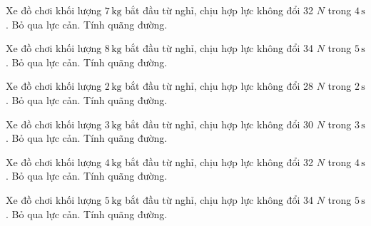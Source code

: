 \begin{ex}
Xe đồ chơi khối lượng $7\,\text{kg}$ bắt đầu từ nghỉ, chịu hợp lực không đổi 32 $N$ trong $4\,\text{s}$. Bỏ qua lực cản. Tính quãng đường.
\end{ex}

\begin{ex}
Xe đồ chơi khối lượng $8\,\text{kg}$ bắt đầu từ nghỉ, chịu hợp lực không đổi 34 $N$ trong $5\,\text{s}$. Bỏ qua lực cản. Tính quãng đường.
\end{ex}

\begin{ex}
Xe đồ chơi khối lượng $2\,\text{kg}$ bắt đầu từ nghỉ, chịu hợp lực không đổi 28 $N$ trong $2\,\text{s}$. Bỏ qua lực cản. Tính quãng đường.
\end{ex}

\begin{ex}
Xe đồ chơi khối lượng $3\,\text{kg}$ bắt đầu từ nghỉ, chịu hợp lực không đổi 30 $N$ trong $3\,\text{s}$. Bỏ qua lực cản. Tính quãng đường.
\end{ex}

\begin{ex}
Xe đồ chơi khối lượng $4\,\text{kg}$ bắt đầu từ nghỉ, chịu hợp lực không đổi 32 $N$ trong $4\,\text{s}$. Bỏ qua lực cản. Tính quãng đường.
\end{ex}

\begin{bt}
Xe đồ chơi khối lượng $5\,\text{kg}$ bắt đầu từ nghỉ, chịu hợp lực không đổi 34 $N$ trong $5\,\text{s}$. Bỏ qua lực cản. Tính quãng đường.
\end{bt}

